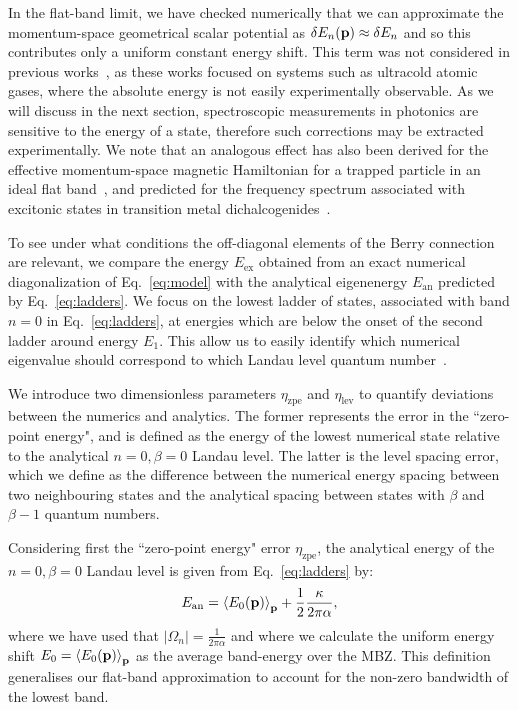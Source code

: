 In the flat-band limit, we have checked numerically that we can
approximate the momentum-space geometrical scalar potential as $\delta
E_n(\mathbf{p}) \approx \delta E_n$ and so this contributes only a uniform
constant energy shift. This term was not considered in previous
works~\cite{price2014magnetic, ozawa2014momhh}, as these works focused
on systems such as ultracold atomic gases, where the absolute energy
is not easily experimentally observable. As we will discuss in the
next section, spectroscopic measurements in photonics are sensitive to
the energy of a state, therefore such corrections may be extracted
experimentally. We note that an analogous effect has also been derived
for the effective momentum-space magnetic Hamiltonian for a trapped
particle in an ideal flat band~\cite{Claassen_prl_2015}, and predicted
for the frequency spectrum associated with excitonic states in
transition metal dichalcogenides~\cite{srivastava:2015}.

To see under what conditions the off-diagonal elements of the Berry
connection are relevant, we compare the energy $E_{\text{ex}}$
obtained from an exact numerical diagonalization of Eq.~\eqref{eq:model}
with the analytical eigenenergy $ E_{\text{an}}$ predicted by
Eq.~\eqref{eq:ladders}. We focus on the lowest ladder of states,
associated with band $n=0$ in Eq.~\eqref{eq:ladders}, at energies which
are below the onset of the second ladder around energy $E_1$. This
allow us to easily identify which numerical eigenvalue should
correspond to which Landau level quantum
number~\cite{price2014magnetic}.

We introduce two dimensionless parameters $\eta_{\text{zpe}}$ and
$\eta_{\text{lev}}$ to quantify deviations between the numerics and
analytics. The former represents the error in the ``zero-point
energy", and is defined as the energy of the lowest numerical state
relative to the analytical $n=0, \beta=0$ Landau level. The latter is the
level spacing error, which we define as the difference between the
numerical energy spacing between two neighbouring states and the
analytical spacing between states with $\beta$ and $\beta-1$ quantum
numbers.

Considering first the ``zero-point energy" error $\eta_{\text{zpe}}$,
the analytical energy of the $n=0, \beta=0$ Landau level is given from
Eq.~\eqref{eq:ladders} by:
%
\begin{equation} E_{\text{an}} = \left<E_0(\mathbf{p})\right>_{\mathbf{p}} +
\frac{1}{2}\frac{\kappa}{2\pi\alpha} ,
\end{equation}
%
where we have used that $|\Omega_n| = \frac{1}{2\pi\alpha}$ and where
we calculate the uniform energy shift
$E_0=\left<E_0(\mathbf{p})\right>_{\mathbf{p}}$ as the average band-energy
over the MBZ. This definition generalises our flat-band approximation
to account for the non-zero bandwidth of the lowest band.

